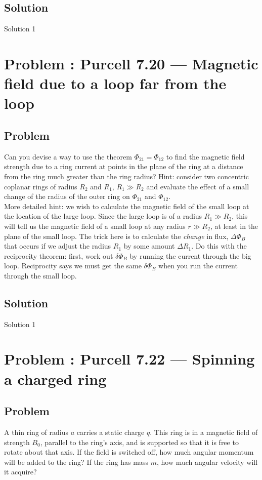 \documentclass[solutions]{esg8022pset}
\begin{document}
\subsection{Solution}
  Solution 1
\section{Problem \thesection: Purcell 7.20 --- Magnetic field due to a loop far from the loop}
\subsection{Problem}
Can you devise a way to use the theorem $\Phi_{21}=\Phi_{12}$ to find the magnetic
 field strength due to a ring current at points in the plane of the ring at a distance from the ring much greater than the ring radius?
 Hint: consider two concentric coplanar rings of radius $R_{2}$ and $R_{1}$, $R_{1}\gg R_{2}$ and evaluate the effect of a small change
  of the radius of the outer ring on $\Phi_{21}$ and $\Phi_{12}$. \\

\noindent  More detailed hint:  we wish to calculate
the magnetic field of the small loop at the location of the large
loop.  Since the large loop is of a radius $R_1 \gg R_2$, this will
tell us the magnetic field of a small loop at any radius $r \gg R_2$,
at least in the plane of the small loop. The trick here is to calculate the {\it change} in
flux, $\Delta\Phi_B$ that occurs if we adjust the radius $R_1$ by
some amount $\Delta R_1$.  Do this with the reciprocity theorem:
first, work out $\delta\Phi_B$ by running the current through the big
loop.  Reciprocity says we must get the same
$\delta\Phi_B$ when you run the current through the small loop.
\subsection{Solution}
  Solution 1
\section{Problem \thesection: Purcell 7.22 --- Spinning a charged ring}
\subsection{Problem}
A thin ring of radius $a$ carries a static charge $q$. This ring is in a magnetic field of strength $B_0$, parallel to the ring's axis, and is supported so that it is free to rotate about that axis. If the field is switched off, how much angular momentum will be added to the ring? If the ring has mass $m$, how much angular velocity will it acquire?
\end{document}
